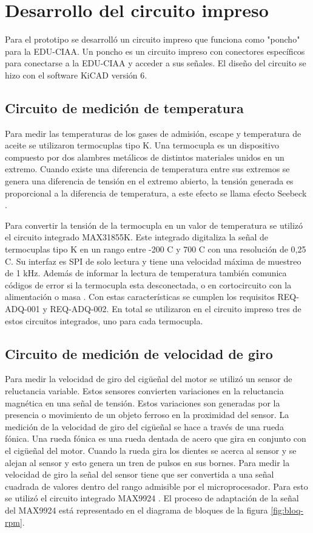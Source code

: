 \section{Desarrollo del circuito impreso} \label{circuito}

Para el prototipo se desarrolló un circuito impreso que funciona como "poncho" para la EDU-CIAA. Un poncho es un circuito impreso con conectores específicos para conectarse a la EDU-CIAA y acceder a sus señales. El diseño del circuito se hizo con el software KiCAD versión 6.

\subsection{Circuito de medición de temperatura}

Para medir las temperaturas de los gases de admisión, escape y temperatura de aceite se utilizaron termocuplas tipo K. Una termocupla es un dispositivo compuesto por dos alambres metálicos de distintos materiales unidos en un extremo. Cuando existe una diferencia de temperatura entre sus extremos se genera una diferencia de tensión en el extremo abierto, la tensión generada es proporcional a la diferencia de temperatura, a este efecto se llama efecto Seebeck \cite{termocupla}.

Para convertir la tensión de la termocupla en un valor de temperatura se utilizó el circuito integrado MAX31855K. Este integrado digitaliza la señal de termocuplas tipo K en un rango entre -200 \degree C y 700 \degree C con una resolución de 0,25 \degree C. Su interfaz es SPI de solo lectura y tiene una velocidad máxima de muestreo de 1 kHz. Además de informar la lectura de temperatura también comunica códigos de error si la termocupla esta desconectada, o en cortocircuito con la alimentación o masa \cite{MAX31855}. Con estas características se cumplen los requisitos REQ-ADQ-001 y REQ-ADQ-002. En total se utilizaron en el circuito impreso tres de estos circuitos integrados, uno para cada termocupla.

\subsection{Circuito de medición de velocidad de giro}

Para medir la velocidad de giro del cigüeñal del motor se utilizó un sensor de reluctancia variable. Estos sensores convierten variaciones en la reluctancia magnética en una señal de tensión. Estos variaciones son generadas por la presencia o movimiento de un objeto ferroso en la proximidad del sensor. La medición de la velocidad de giro del cigüeñal se hace a través de una rueda fónica. Una rueda fónica es una rueda dentada de acero que gira en conjunto con el cigüeñal del motor. Cuando la rueda gira los dientes se acerca al sensor y se alejan al sensor y esto genera un tren de pulsos en sus bornes. Para medir la velocidad de giro la señal del sensor tiene que ser convertida a una señal cuadrada de valores dentro del rango admisible por el microprocesador. Para esto se utilizó el circuito integrado MAX9924 \cite{MAX9924}. El proceso de adaptación de la señal del MAX9924 está representado en el diagrama de bloques de la figura \ref{fig:bloq-rpm}.

